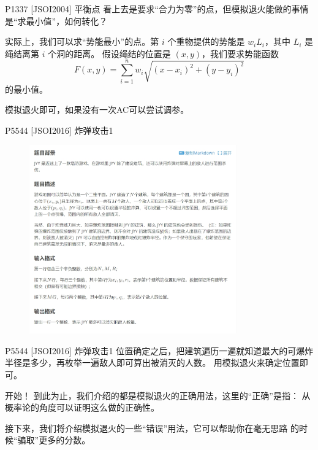 \documentclass{beamer}
\begin{document}
\begin{frame}{P1337 [JSOI2004] 平衡点}
    \small
    看上去是要求“合力为零”的点，但模拟退火能做的事情是“求最小值”，如何转化？

    \pause
    实际上，我们可以求“势能最小”的点。第 $i$ 个重物提供的势能是 $w_iL_i$，其中 $L_i$ 是绳结离第 $i$ 个洞的距离。
    假设绳结的位置是 $(x,y)$，我们要求势能函数
    \begin{equation*}
        F(x,y)=\sum_{i=1}^n w_i \sqrt{(x-x_i)^2+(y-y_i)^2}
    \end{equation*}
    的最小值。

    \pause
    模拟退火即可，如果没有一次AC可以尝试调参。
\end{frame}

\begin{frame}{P5544 [JSOI2016] 炸弹攻击1}
    \small
    \begin{figure}[H]
        \centering
        \includegraphics[width=0.8\textwidth]{pic/p5544.png}
    \end{figure}
\end{frame}

\begin{frame}{P5544 [JSOI2016] 炸弹攻击1}
    \small
    位置确定之后，把建筑遍历一遍就知道最大的可爆炸半径是多少，再枚举一遍敌人即可算出被消灭的人数。
    \vspace{1em}
    \pause
    用模拟退火来确定位置即可。
\end{frame}

\begin{frame}{开始！}
    \small
    到此为止，我们介绍的都是模拟退火的正确用法，这里的“正确”是指：
    从概率论的角度可以证明这么做的正确性。

    \pause
    接下来，我们将介绍模拟退火的一些“错误”用法，它可以帮助你在毫无思路
    的时候“骗取”更多的分数。
\end{frame}
\end{document}
